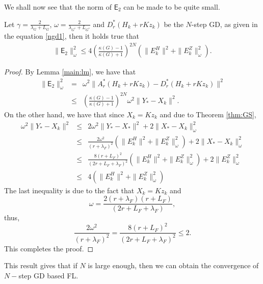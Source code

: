 We shall now see that the norm of $\textsf{E}_2$ can be made to be quite small. 
\begin{lemma}
Let $\gamma = \frac{2}{\lambda_G + L_G}$, $\omega = \frac{2}{\lambda_{G^*} + L_{G^*}}$ and $D_r^*(H_k + rKz_k)$ be the $N$-step GD, as given in the equation \eqref{ngd1}, then it holds true that 
\begin{eqnarray*}
\|\textsf{E}_2\|_\omega^2 \leq 4 \left ( \frac{\kappa(G) - 1}{\kappa(G) + 1} \right )^{2N} \left ( \|E_k^H\|^2 + \|E_k^Z\|_\omega^2 \right ). 
\end{eqnarray*}
\end{lemma}
\begin{proof}
By Lemma \ref{main:lm}, we have that 
\begin{eqnarray*}
\|\textsf{E}_2\|_\omega^2 &=& \omega^2 \|A_r^*(H_k + rKz_k) - D_r^*(H_k + rKz_k)\|^2 \\
&\leq& \left ( \frac{\kappa(G) - 1}{\kappa(G) + 1} \right )^{2N} \omega^2 \|Y_* - X_k\|^2. 
\end{eqnarray*}
On the other hand, we have that since $X_k = Kz_k$ and due to Theorem \ref{thm:GS},  
\begin{eqnarray*}
\omega^2 \|Y_* - X_k\|^2 &\leq& 2 \omega^2 \|Y_* - X_*\|^2 + 2 \|X_* - X_k\|_\omega^2 \\ 
&\leq& \frac{2 \omega^2}{(r + \lambda_F)^2} \left ( \|E_k^H\|^2 + \|E_k^Z\|_\omega ^2 \right ) + 2 \|X_* - X_k\|_\omega^2 \\
&\leq& \frac{8(r + L_F)^2}{(2r + L_F + \lambda_F)^2} \left ( \|E_k^H\|^2 + \|E_k^Z\|_\omega ^2 \right ) + 2 \|E_k^Z\|_\omega^2 \\ 
&\leq& 4 \left ( \|E_k^H\|^2 + \|E_k^Z\|_\omega ^2 \right ) \end{eqnarray*} 
The last inequality is due to the fact that $X_k = Kz_k$ and 
\begin{equation}
\omega = \frac{2(r + \lambda_F)(r + L_F)}{(2r + L_F + \lambda_F)},
\end{equation} 
thus, 
\begin{equation}
\frac{2 \omega^2}{(r + \lambda_F)^2} = \frac{8(r+L_F)^2}{(2r + L_F + \lambda_F)^2} \leq 2.  
\end{equation}
This completes the proof. 
\end{proof}
This result gives that if $N$ is large enough, then we can obtain the convergence of $N-$step GD based FL. 





